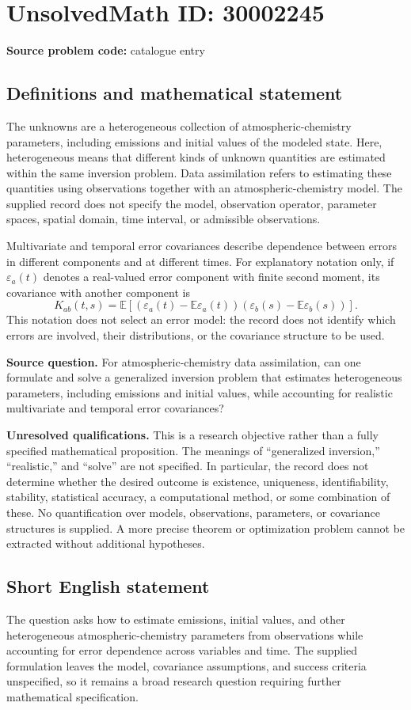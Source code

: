 \documentclass[11pt]{article}
\begin{document}
\section*{UnsolvedMath ID: 30002245}
\textbf{Source problem code:} catalogue entry
\subsection{Definitions and mathematical statement}
The unknowns are a heterogeneous collection of atmospheric-chemistry parameters, including emissions and initial values of the modeled state. Here, heterogeneous means that different kinds of unknown quantities are estimated within the same inversion problem. Data assimilation refers to estimating these quantities using observations together with an atmospheric-chemistry model. The supplied record does not specify the model, observation operator, parameter spaces, spatial domain, time interval, or admissible observations.

Multivariate and temporal error covariances describe dependence between errors in different components and at different times. For explanatory notation only, if \(\varepsilon_a(t)\) denotes a real-valued error component with finite second moment, its covariance with another component is
\[
K_{ab}(t,s)=\mathbb{E}\!\left[(\varepsilon_a(t)-\mathbb{E}\varepsilon_a(t))(\varepsilon_b(s)-\mathbb{E}\varepsilon_b(s))\right].
\]
This notation does not select an error model: the record does not identify which errors are involved, their distributions, or the covariance structure to be used.

\textbf{Source question.} For atmospheric-chemistry data assimilation, can one formulate and solve a generalized inversion problem that estimates heterogeneous parameters, including emissions and initial values, while accounting for realistic multivariate and temporal error covariances?

\textbf{Unresolved qualifications.} This is a research objective rather than a fully specified mathematical proposition. The meanings of ``generalized inversion,'' ``realistic,'' and ``solve'' are not specified. In particular, the record does not determine whether the desired outcome is existence, uniqueness, identifiability, stability, statistical accuracy, a computational method, or some combination of these. No quantification over models, observations, parameters, or covariance structures is supplied. A more precise theorem or optimization problem cannot be extracted without additional hypotheses.
\subsection{Short English statement}
The question asks how to estimate emissions, initial values, and other heterogeneous atmospheric-chemistry parameters from observations while accounting for error dependence across variables and time. The supplied formulation leaves the model, covariance assumptions, and success criteria unspecified, so it remains a broad research question requiring further mathematical specification.
\end{document}
